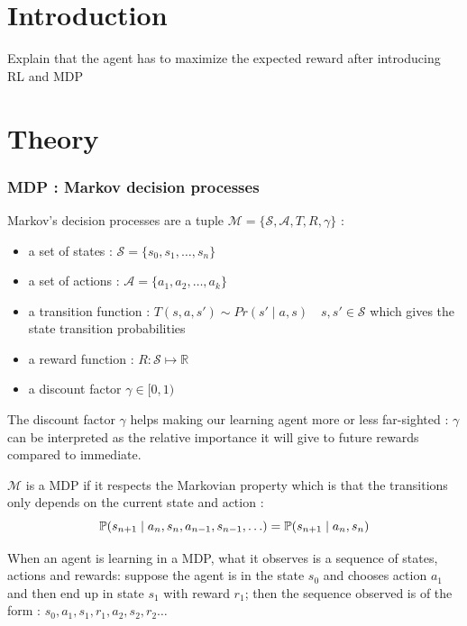 \documentclass[14pt,a4paper]{article}
\theoremstyle{definition}
\begin{document}
\part*{Introduction}
Explain that the agent has to maximize the expected reward after introducing  RL and MDP
\citep{Xia2015}


\part*{Theory}

\section{MDP : Markov decision processes}



Markov's decision processes are a tuple  $\mathcal{M}=\{\mathcal{S},\mathcal{A},T,R,\gamma\}$ : 

\begin{itemize}
\item a set of states : $\mathcal{S}=\{s_0,s_1,\ldots,s_n\}$
\item a set of actions  : $\mathcal{A}=\{a_1,a_2,\ldots ,a_k\}$
\item a transition function :  $T(s,a,s') \sim  Pr(s'\mid a, s) \quad s,s' \in \mathcal{S}$ which gives the state transition probabilities
\item a reward function : $R:\mathcal{S}\mapsto \mathbb{R} $
\item a discount factor $\gamma \in [0,1)$
\end{itemize}


The discount factor $\gamma $ helps making our learning agent more or less far-sighted : $\gamma$ can be interpreted as the relative importance it will give to future rewards compared to immediate.

$\mathcal{M}$ is a MDP if it respects the Markovian property which is that the transitions only depends on the current state and action : 
\begin{equation*}
\mathbb{P}(s_{n+1}\mid a_{n},s_{n},a_{n-1},s_{n-1},\ldots)=\mathbb{P}(s_{n+1}\mid a_{n},s_{n})\\
\end{equation*}


When an agent is learning in a MDP, what it observes is a sequence of states, actions and rewards: suppose the agent is in the state $s_0$ and chooses action $a_1$ and then end up in state $s_1$ with reward $r_1$; then the sequence observed is of the form : $s_0,a_1,s_1,r_1,a_2,s_2,r_2\ldots$
\end{document}
